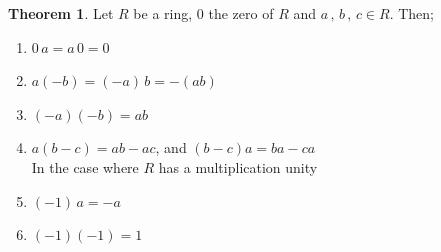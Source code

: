 \documentclass[11pt,a4paper]{article}
\theoremstyle{definition}
\newtheorem{thm}{Theorem}[subsection]
\begin{document}
\begin{thm}
Let $R$ be a ring, $0$ the zero of $R$ and $a\, , \, b\, , \, c \in R$. Then;
\begin{enumerate}
\item $0\,a = a\, 0 = 0$
\item $a (-b) = (-a)\, b = - (ab)$
\item $(-a)(-b) = ab$
\item $a(b-c) = ab - ac$, and $(b - c)a = ba - ca$\\

In the case where $R$ has a multiplication unity
\item $(-1)\, a = -a$
\item $(-1)(-1) = 1$\\\\\\
\end{enumerate}
\end{thm}
\end{document}
